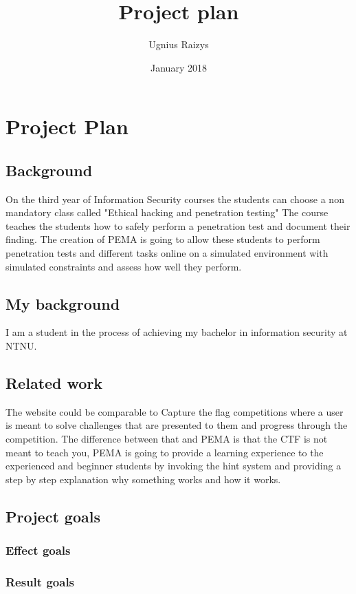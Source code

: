 \documentclass{article}
\title{\textbf{Project plan}}
\author{Ugnius Raizys }
\date{January 2018}
\begin{document}
\maketitle
\tableofcontents


\section{Project Plan}
\subsection{\textbf{Background}}
On the third year of Information Security courses the students can choose a non mandatory class called "Ethical hacking and penetration testing" The course teaches the students how to safely perform a penetration test and document their finding. The creation of PEMA is going to allow these students to perform penetration tests and different tasks online on a simulated environment with simulated constraints and assess how well they perform. 

\subsection{\textbf{My background}} 
I am a student in the process of  achieving my bachelor in information security at NTNU. 

\subsection{\textbf{Related work}} 
The website could be comparable to Capture the flag competitions where a user is meant to solve challenges that are presented to them and progress through the competition. The difference between that and PEMA is that the CTF is not meant to teach you, PEMA is going to provide a learning experience to the experienced and beginner students by invoking the hint system and providing a step by step explanation why something works and how it works. 

\subsection{\textbf{Project goals}}
\subsubsection{\textbf{Effect goals}}
\subsubsection{\textbf{Result goals}}
\end{document}
